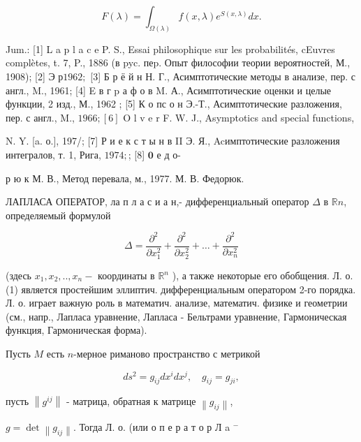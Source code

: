 \documentclass[10pt]{article}
\begin{document}
\[

F(\lambda)=\int_{\Omega(\lambda)} f(x, \lambda) e^{S(x, \lambda)} d x .

\]



Jum.: [1] L a p l a c e P. S., Essai philosophique sur les probabilités, cEuvres complètes, t. 7, P., 1886 (в pyc. пеp. Опыт философии теории вероятностей, М., 1908); [2] Э р$1962 ;$ [3] Б р ё й н Н. Г., Асимптотические методы в анализе, пер. с англ., M., 1961; [4] E в г p а ф о в M. А., Асимптотические оценки и целые функции, 2 изд., М., 1962 ; [5] К о пс о н Э.-Т., Асимптотические разложения, пер. с англ., M., $1966 ;[6]$ O l v e r F. W. J., Asymptotics and special functions,

N. Y. [a. о.], 197/; [7] Р и е к с т ы н в II $Э$. Я., Acимптотические разложения интегралов, т. 1, Рига, $1974 ;$; [8] $\mathbf{0}$ е д о-



р ю к М. В., Метод перевала, м., 1977. М. В. Федорюк.

ЛАПЛАСА ОПЕРАТОР, ла п л а с и а н,- дифференциальный оператор $\Delta$ в $\mathbb{R} n$, определяемый формулой



\[

\Delta=\frac{\partial^{2}}{\partial x_{1}^{2}}+\frac{\partial^{2}}{\partial x_{2}^{2}}+\ldots+\frac{\partial^{2}}{\partial x_{n}^{2}}

\]



(здесь $x_{1}, x_{2}, . ., x_{n}-$ координаты в $\mathbb{R}^{n}$ ), а также некоторые его обобщения. Л. о. (1) является простейшим эллиптич. дифференциальным оператором 2-го порядка. Л. о. играет важную роль в математич. анализе, математич. физике и геометрии (см., напр., Лапласа уравнение, Лапласа - Бельтрами уравнение, Гармоническая функция, Гармоническая форма).



Пусть $M$ есть $n$-мерное риманово пространство с метрикой



\[

d s^{2}=g_{i j} d x^{i} d x^{j}, \quad g_{i j}=g_{j i},

\]



пусть $\left\|g^{i j}\right\|$ - матрица, обратная к матрице $\left\|g_{i j}\right\|$,

$g=\operatorname{det}\left\|g_{i j}\right\|$. Тогда Л. о. (или о п е р а т о р Л a ${ }^{-}$
\end{document}
